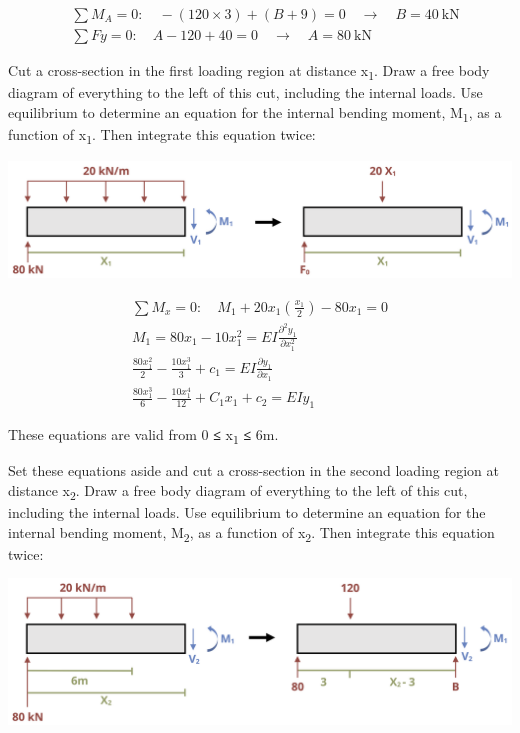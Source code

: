 \documentclass[
  letterpaper,
  DIV=11,
  numbers=noendperiod]{scrreprt}
\begin{document}
\begin{tcolorbox}
\begin{tcolorbox}
\[
\begin{aligned} & \sum M_A=0: \quad -(120 \times 3)+(B+9)=0 \quad \rightarrow \quad B=40 \mathrm{~kN} \\ & \sum F y=0: \quad A-120+40=0 \quad \rightarrow \quad A=80 \mathrm{~kN}\end{aligned}
\]

Cut a cross-section in the first loading region at distance
x\textsubscript{1}. Draw a free body diagram of everything to the left
of this cut, including the internal loads. Use equilibrium to determine
an equation for the internal bending moment, M\textsubscript{1}, as a
function of x\textsubscript{1}. Then integrate this equation twice:

\begin{center}
\includegraphics{images/CH11 PNGs/example11.3-3.png}
\end{center}

\[
\begin{gathered}  \sum M_x=0: \quad M_1+20 x_1\left(\frac{x_1}{2}\right)-80 x_1=0 \\  M_1=80 x_1-10 x_1^2=E I \frac{\partial^2 y_1}{\partial x_1^2} \\  \frac{80 x_1^2}{2}-\frac{10 x_1^3}{3}+c_1=E I \frac{\partial y_1}{\partial x_1} \\ \frac{80 x_1^3}{6}-\frac{10 x_1^4}{12}+C_1 x_1+c_2=E I y_1\end{gathered}
\]

These equations are valid from 0 \textbf{≤} x\textsubscript{1}
\textbf{≤} 6m.

Set these equations aside and cut a cross-section in the second loading
region at distance x\textsubscript{2}. Draw a free body diagram of
everything to the left of this cut, including the internal loads. Use
equilibrium to determine an equation for the internal bending moment,
M\textsubscript{2}, as a function of x\textsubscript{2}. Then integrate
this equation twice:

\begin{center}
\includegraphics{images/CH11 PNGs/example11.3-4.png}
\end{center}


\end{tcolorbox}
\end{tcolorbox}
\end{document}
